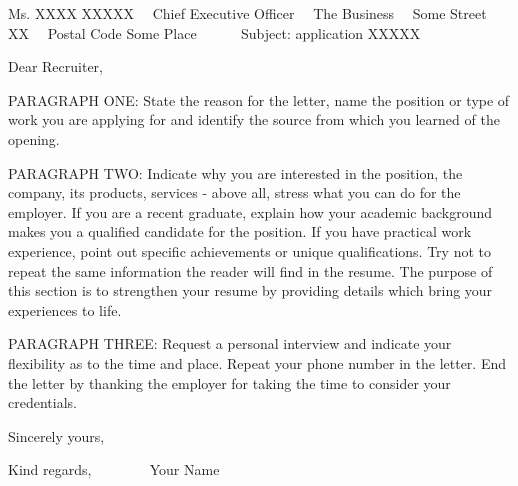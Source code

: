 \documentclass[dutch]{scrlttr2}
\renewcommand{\\}{\ {\large\textperiodcentered}\ }
\begin{document}


\begin{letter}{ %
Ms. XXXX XXXXX\\
Chief Executive Officer\\
The Business\\
Some Street XX\\
Postal Code Some Place\\
~\\
Subject: application XXXXX
}


\opening{ }

\addvspace{4cm} %

Dear Recruiter,\\ %

PARAGRAPH ONE: State the reason for the letter, name the position or type of work you
are applying for and identify the source from which you learned of the opening.\\

PARAGRAPH TWO: Indicate why you are interested in the position, the company, its products,
services - above all, stress what you can do for the employer. If you are a recent graduate,
explain how your academic background makes you a qualified candidate for the position. If
you have practical work experience, point out specific achievements or unique qualifications.
Try not to repeat the same information the reader will find in the resume. The purpose of this
section is to strengthen your resume by providing details which bring your experiences to life.\\

PARAGRAPH THREE: Request a personal interview and indicate your flexibility as to the
time and place. Repeat your phone number in the letter. End the letter by thanking the employer
for taking the time to consider your credentials.\\

Sincerely yours,\\

Kind regards,\\
~\\\\
Your Name\\


\end{letter}
\end{document}
